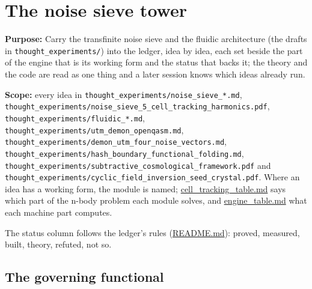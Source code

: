 \chapter{\texorpdfstring{The noise sieve tower}{The noise sieve tower}}
\label{chap:noise-sieve-tower}

\textbf{Purpose:} Carry the transfinite noise sieve and the fluidic architecture (the drafts in \texttt{thought\_\allowbreak{}experiments/\allowbreak{}}) into the ledger, idea by idea, each set beside the part of the engine that is its working form and the status that backs it; the theory and the code are read as one thing and a later session knows which ideas already run.

\textbf{Scope:} every idea in \texttt{thought\_\allowbreak{}experiments/\allowbreak{}noise\_\allowbreak{}sieve\_\allowbreak{}*.\allowbreak{}md}, \texttt{thought\_\allowbreak{}experiments/\allowbreak{}noise\_\allowbreak{}sieve\_\allowbreak{}5\_\allowbreak{}cell\_\allowbreak{}tracking\_\allowbreak{}harmonics.\allowbreak{}pdf}, \texttt{thought\_\allowbreak{}experiments/\allowbreak{}fluidic\_\allowbreak{}*.\allowbreak{}md}, \texttt{thought\_\allowbreak{}experiments/\allowbreak{}utm\_\allowbreak{}demon\_\allowbreak{}openqasm.\allowbreak{}md}, \texttt{thought\_\allowbreak{}experiments/\allowbreak{}demon\_\allowbreak{}utm\_\allowbreak{}four\_\allowbreak{}noise\_\allowbreak{}vectors.\allowbreak{}md}, \texttt{thought\_\allowbreak{}experiments/\allowbreak{}hash\_\allowbreak{}boundary\_\allowbreak{}functional\_\allowbreak{}folding.\allowbreak{}md}, \texttt{thought\_\allowbreak{}experiments/\allowbreak{}subtractive\_\allowbreak{}cosmological\_\allowbreak{}framework.\allowbreak{}pdf} and \texttt{thought\_\allowbreak{}experiments/\allowbreak{}cyclic\_\allowbreak{}field\_\allowbreak{}inversion\_\allowbreak{}seed\_\allowbreak{}crystal.\allowbreak{}pdf}. Where an idea has a working form, the module is named; \hyperref[chap:cell-tracking-table]{cell\_\allowbreak{}tracking\_\allowbreak{}table.md} says which part of the n-body problem each module solves, and \hyperref[chap:engine-table]{engine\_\allowbreak{}table.md} what each machine part computes.

The status column follows the ledger's rules (\hyperref[chap:readme]{README.md}): proved, measured, built, theory, refuted, not so.

\section{\texorpdfstring{The governing functional}{The governing functional}}

